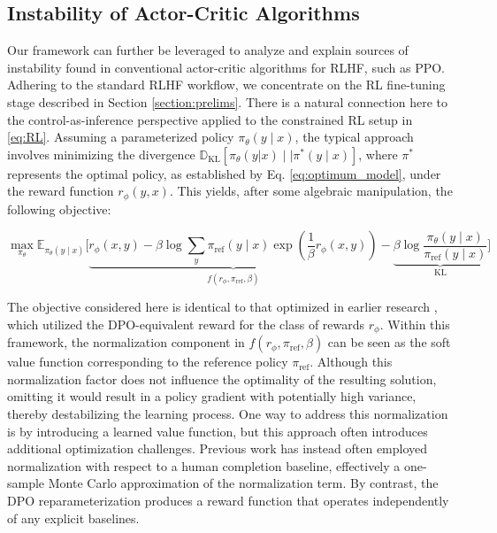 \subsection{Instability of Actor-Critic Algorithms} Our framework can further be leveraged to analyze and explain sources of instability found in conventional actor-critic algorithms for RLHF, such as PPO. Adhering to the standard RLHF workflow, we concentrate on the RL fine-tuning stage described in Section \ref{section:prelims}. There is a natural connection here to the control-as-inference perspective \cite{levine2018reinforcement} applied to the constrained RL setup in \ref{eq:RL}. Assuming a parameterized policy $\pi_{\theta}(y\mid x)$, the typical approach involves minimizing the divergence $\mathbb{D}_{\text{KL}}[\pi_{\theta}(y|x) \mid \mid \pi^*(y\mid x)]$, where $\pi^*$ represents the optimal policy, as established by Eq. \ref{eq:optimum_model}, under the reward function $r_{\phi}(y, x)$. This yields, after some algebraic manipulation, the following objective:

\begin{equation}\label{eq:AC}
    \max_{\pi_{\theta}}\mathbb{E}_{\pi_{\theta}(y\mid x)}\bigg[\underbrace{r_{\phi}(x, y) -\beta\log\sum_{y}\pi_\text{ref}(y\mid x)\exp\left(\frac{1}{\beta}r_{\phi}(x, y)\right)}_{f(r_{\phi}, \pi_\text{ref}, \beta)} - \underbrace{\beta\log\frac{\pi_{\theta}(y\mid x)}{\pi_\text{ref}(y\mid x)}}_{\text{KL}}\bigg]
\end{equation}

The objective considered here is identical to that optimized in earlier research 
\citep{ziegler2020finetuning, stiennon2022learning, bai2022training, ouyang2022training}, which utilized the DPO-equivalent reward for the class of rewards $r_{\phi}$. Within this framework, the normalization component in $f(r_{\phi}, \pi_\text{ref}, \beta)$ can be seen as the soft value function corresponding to the reference policy $\pi_\text{ref}$. Although this normalization factor does not influence the optimality of the resulting solution, omitting it would result in a policy gradient with potentially high variance, thereby destabilizing the learning process. One way to address this normalization is by introducing a learned value function, but this approach often introduces additional optimization challenges. Previous work has instead often employed normalization with respect to a human completion baseline, effectively a one-sample Monte Carlo approximation of the normalization term. By contrast, the DPO reparameterization produces a reward function that operates independently of any explicit baselines. 


